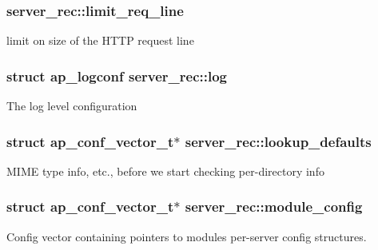 \subsubsection[{\texorpdfstring{limit\+\_\+req\+\_\+line}{limit_req_line}}]{ server\+\_\+rec\+::limit\+\_\+req\+\_\+line}\hypertarget{structserver__rec_a40a887a3321667e38cfbaf7d683bcbcf}{}\label{structserver__rec_a40a887a3321667e38cfbaf7d683bcbcf}
limit on size of the H\+T\+TP request line 
\subsubsection[{\texorpdfstring{log}{log}}]{\setlength{\rightskip}{0pt plus 5cm}struct {\bf ap\+\_\+logconf} server\+\_\+rec\+::log}\hypertarget{structserver__rec_ad5e3b116b62837693b3149a78b95d8d9}{}\label{structserver__rec_ad5e3b116b62837693b3149a78b95d8d9}
The log level configuration 
\subsubsection[{\texorpdfstring{lookup\+\_\+defaults}{lookup_defaults}}]{\setlength{\rightskip}{0pt plus 5cm}struct {\bf ap\+\_\+conf\+\_\+vector\+\_\+t}$\ast$ server\+\_\+rec\+::lookup\+\_\+defaults}\hypertarget{structserver__rec_ac4527ccab39baa34ec498011896faee1}{}\label{structserver__rec_ac4527ccab39baa34ec498011896faee1}
M\+I\+ME type info, etc., before we start checking per-\/directory info 
\subsubsection[{\texorpdfstring{module\+\_\+config}{module_config}}]{\setlength{\rightskip}{0pt plus 5cm}struct {\bf ap\+\_\+conf\+\_\+vector\+\_\+t}$\ast$ server\+\_\+rec\+::module\+\_\+config}\hypertarget{structserver__rec_ad18636e68c9070745578ebc966cfa430}{}\label{structserver__rec_ad18636e68c9070745578ebc966cfa430}
Config vector containing pointers to modules\textquotesingle{} per-\/server config structures. 
